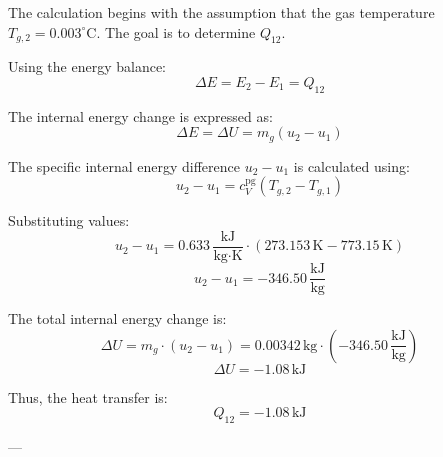 The calculation begins with the assumption that the gas temperature \( T_{g,2} = 0.003^\circ\text{C} \). The goal is to determine \( Q_{12} \).  

Using the energy balance:  
\[
\Delta E = E_2 - E_1 = Q_{12}
\]  

The internal energy change is expressed as:  
\[
\Delta E = \Delta U = m_g (u_2 - u_1)
\]  

The specific internal energy difference \( u_2 - u_1 \) is calculated using:  
\[
u_2 - u_1 = c_V^{\text{pg}} (T_{g,2} - T_{g,1})
\]  

Substituting values:  
\[
u_2 - u_1 = 0.633 \, \frac{\text{kJ}}{\text{kg·K}} \cdot (273.153 \, \text{K} - 773.15 \, \text{K})
\]  
\[
u_2 - u_1 = -346.50 \, \frac{\text{kJ}}{\text{kg}}
\]  

The total internal energy change is:  
\[
\Delta U = m_g \cdot (u_2 - u_1) = 0.00342 \, \text{kg} \cdot (-346.50 \, \frac{\text{kJ}}{\text{kg}})
\]  
\[
\Delta U = -1.08 \, \text{kJ}
\]  

Thus, the heat transfer is:  
\[
Q_{12} = -1.08 \, \text{kJ}
\]  

---